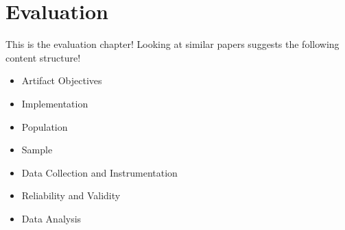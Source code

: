 \chapter{\leavevmode Evaluation}

\label{chap:evaluation}

% 



This is the evaluation chapter! Looking at similar papers suggests the following content structure!

\begin{itemize}
  \item Artifact Objectives
  \item Implementation
  \item Population
  \item Sample
  \item Data Collection and Instrumentation
  \item Reliability and Validity
  \item Data Analysis
\end{itemize}
